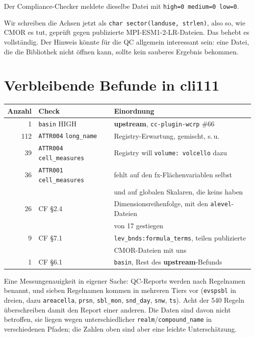 \documentclass[11pt,a4paper]{article}
\newcommand{\code}[1]{\texttt{\small #1}}
\newcommand{\upstream}{\textcolor{blue!60!black}{\textbf{upstream}}}
\begin{document}
Der Compliance-Checker meldete dieselbe Datei mit \code{high=0 medium=0 low=0}.

Wir schreiben die Achsen jetzt als \code{char sector(landuse, strlen)}, also so, wie
CMOR es tut, gepr\"uft gegen publizierte MPI-ESM1-2-LR-Dateien. Das behebt es
vollst\"andig. Der Hinweis k\"onnte f\"ur die QC allgemein interessant sein: eine
Datei, die die Bibliothek nicht \"offnen kann, sollte kein sauberes Ergebnis
bekommen.

\section{Verbleibende Befunde in cli111}

\begin{longtable}{rll}
\toprule
\textbf{Anzahl} & \textbf{Check} & \textbf{Einordnung} \\
\midrule
\endhead
1   & \code{basin} HIGH   & \upstream, \code{cc-plugin-wcrp} \#66 \\
112 & \code{ATTR004} \code{long\_name} & Registry-Erwartung, gemischt, s.\,u. \\
39  & \code{ATTR004} \code{cell\_measures} & Registry will \code{volume: volcello} dazu \\
36  & \code{ATTR001} \code{cell\_measures} & fehlt auf den fx-Fl\"achenvariablen selbst \\
    &                     & und auf globalen Skalaren, die keins haben \\
26  & CF \S2.4            & Dimensionsreihenfolge, mit den \code{alevel}-Dateien \\
    &                     & von 17 gestiegen \\
9   & CF \S7.1            & \code{lev\_bnds:formula\_terms}, teilen publizierte \\
    &                     & CMOR-Dateien mit uns \\
1   & CF \S6.1            & \code{basin}, Rest des \upstream-Befunds \\
\bottomrule
\end{longtable}

Eine Messungenauigkeit in eigener Sache: QC-Reports werden nach Regelnamen
benannt, und sieben Regelnamen kommen in mehreren Tiers vor (\code{evspsbl} in
dreien, dazu \code{areacella}, \code{prsn}, \code{sbl\_mon}, \code{snd\_day},
\code{snw}, \code{ts}). Acht der 540 Regeln \"uberschreiben damit den Report einer
anderen. Die Daten sind davon nicht betroffen, sie liegen wegen unterschiedlicher
\code{realm}/\code{compound\_name} in verschiedenen Pfaden; die Zahlen oben sind
aber eine leichte Untersch\"atzung.
\end{document}
